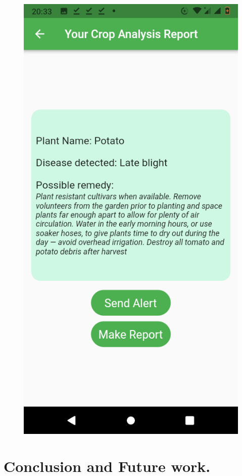 \documentclass[11pt]{report}
\begin{document}
\begin{figure}[h]
	\centerline{\small 
		\includegraphics[height=0.25\textheight]  {r1}}
\end{figure}



\newpage
\chapter{Conclusion and Future work.}
\end{document}
